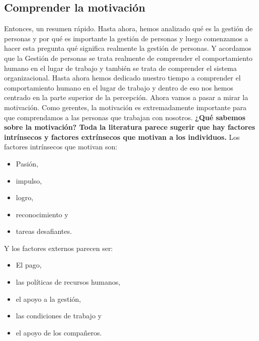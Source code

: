 \documentclass[10pt]{book}
\begin{document}
\subsection{Comprender la motivación}
Entonces, un resumen rápido. Hasta ahora, hemos analizado qué es la gestión de personas y por qué es importante la gestión de personas y luego comenzamos a hacer esta pregunta qué significa realmente la gestión de personas. Y acordamos que la Gestión de personas se trata realmente de comprender el comportamiento humano en el lugar de trabajo y también se trata de comprender el sistema organizacional. Hasta ahora hemos dedicado nuestro tiempo a comprender el comportamiento humano en el lugar de trabajo y dentro de eso nos hemos centrado en la parte superior de la percepción. Ahora vamos a pasar a mirar la motivación. Como gerentes, la motivación es extremadamente importante para que comprendamos a las personas que trabajan con nosotros. \textbf{¿Qué sabemos sobre la motivación? Toda la literatura parece sugerir que hay factores intrínsecos y factores extrínsecos que motivan a los individuos.} Los factores intrínsecos que motivan son:
\begin{itemize}
\item Pasión,
\item impulso,
\item logro,
\item reconocimiento y
\item tareas desafiantes.
\end{itemize} 
Y los factores externos parecen ser:
\begin{itemize}
\item El pago, 
\item las políticas de recursos humanos,
\item el apoyo a la gestión,
\item las condiciones de trabajo y
\item el apoyo de los compañeros.
\end{itemize} 
\end{document}
